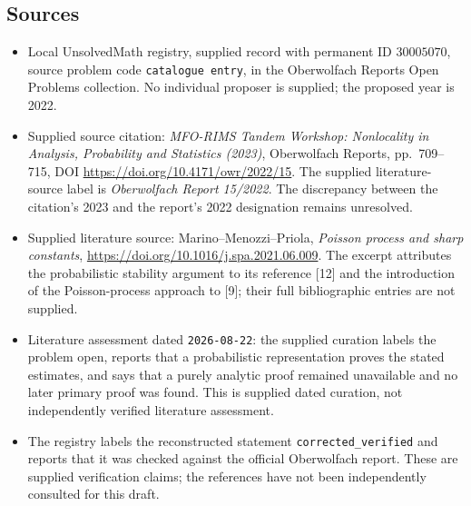\documentclass[11pt]{article}
\begin{document}
\subsection{Sources}
\begin{itemize}
\item Local UnsolvedMath registry, supplied record with permanent ID \(30005070\), source problem code \texttt{catalogue entry}, in the Oberwolfach Reports Open Problems collection. No individual proposer is supplied; the proposed year is 2022.
\item Supplied source citation: \emph{MFO-RIMS Tandem Workshop: Nonlocality in Analysis, Probability and Statistics (2023)}, Oberwolfach Reports, pp.~709--715, DOI \url{https://doi.org/10.4171/owr/2022/15}. The supplied literature-source label is \emph{Oberwolfach Report 15/2022}. The discrepancy between the citation's 2023 and the report's 2022 designation remains unresolved.
\item Supplied literature source: Marino--Menozzi--Priola, \emph{Poisson process and sharp constants}, \url{https://doi.org/10.1016/j.spa.2021.06.009}. The excerpt attributes the probabilistic stability argument to its reference [12] and the introduction of the Poisson-process approach to [9]; their full bibliographic entries are not supplied.
\item Literature assessment dated \texttt{2026-08-22}: the supplied curation labels the problem open, reports that a probabilistic representation proves the stated estimates, and says that a purely analytic proof remained unavailable and no later primary proof was found. This is supplied dated curation, not independently verified literature assessment.
\item The registry labels the reconstructed statement \texttt{corrected\_verified} and reports that it was checked against the official Oberwolfach report. These are supplied verification claims; the references have not been independently consulted for this draft.
\end{itemize}
\end{document}
